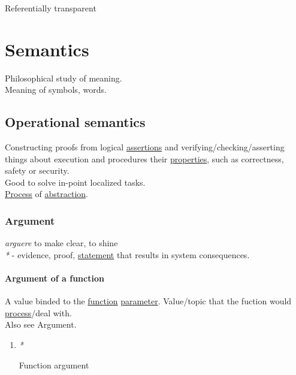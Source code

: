 \documentclass[a4paper,14pt,oneside]{book}
\begin{document}
\label{orgb2b0199}Referentially transparent\\

\chapter{\label{org83ac847}Semantics}
\label{sec:orgefc8efe}
Philosophical study of meaning.\\
Meaning of symbols, words.\\

\section{\label{org8164710}Operational semantics}
\label{sec:org880a43d}
Constructing proofs from logical \hyperref[org93974d6]{assertions} and verifying/checking/asserting things about execution and procedures their \hyperref[org5d2ad49]{properties}, such as correctness, safety or security.\\

Good to solve in-point localized tasks.\\

\hyperref[orgfdfd3f6]{Process} of \hyperref[org4b78719]{abstraction}.\\

\subsection{\label{org64a41d1}Argument}
\label{sec:org145d0ed}
\emph{arguere} to make clear, to shine\\

\emph{*} - evidence, proof, \hyperref[org1136762]{statement} that results in system consequences.\\

\subsubsection{\label{orgadc8366}Argument of a function}
\label{sec:org3782c90}
A value binded to the \hyperref[orgad0a745]{function} \hyperref[org65aaf9b]{parameter}. Value/topic that the fuction would \hyperref[orgfdfd3f6]{process}/deal with.\\

Also see \label{org450b834}Argument.\\

\begin{enumerate}
\item \emph{*}
\label{sec:orgdd28ff5}

\label{orgda64b89}Function argument\\
\end{enumerate}
\end{document}
